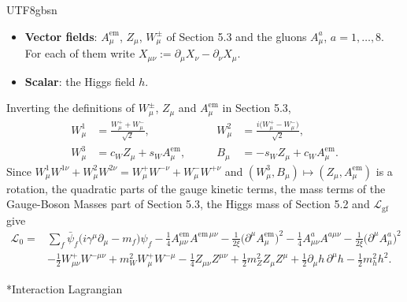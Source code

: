 \documentclass[11pt,a4paper,oneside]{report}
\makeatletter
\newcommand\topic{\@startsection{paragraph}{4}{\z@}{-1.7ex plus -.3ex}{.5ex}{\normalfont\normalsize\bfseries\itshape\boldmath}*}
\makeatother
\begin{document}
\begin{CJK*}{UTF8}{gbsn}
\begin{itemize}
\item \textbf{\boldmath Vector fields}: $A^{\mathrm{em}}_\mu$, $Z_\mu$, $W^\pm_\mu$ of Section 5.3 and the gluons $A^a_\mu$, $a=1,\ldots,8$. For each of them write $X_{\mu\nu}:=\partial_\mu X_\nu-\partial_\nu X_\mu$.

\item \textbf{\boldmath Scalar}: the Higgs field $h$.
\end{itemize}


Inverting the definitions of $W^\pm_\mu$, $Z_\mu$ and $A^{\mathrm{em}}_\mu$ in Section 5.3,
\begin{equation*}
\begin{aligned}
W^1_\mu&=\frac{W^+_\mu+W^-_\mu}{\sqrt2},&\qquad 
W^2_\mu&=\frac{i\bigl(W^+_\mu-W^-_\mu\bigr)}{\sqrt2},\\[3pt]
W^3_\mu&=c_WZ_\mu+s_WA^{\mathrm{em}}_\mu,&\qquad 
B_\mu&=-s_WZ_\mu+c_WA^{\mathrm{em}}_\mu .
\end{aligned}
\tag{A.2}\label{eq:A.2}
\end{equation*}
Since $W^1_\mu W^{1\nu}+W^2_\mu W^{2\nu}=W^+_\mu W^{-\nu}+W^-_\mu W^{+\nu}$ and $(W^3_\mu,B_\mu)\mapsto(Z_\mu,A^{\mathrm{em}}_\mu)$ is a rotation, the quadratic parts of the gauge kinetic terms, the mass terms of the Gauge-Boson Masses part of Section 5.3, the Higgs mass of Section 5.2 and $\mathcal L_{\mathrm{gf}}$ give
\begin{equation*}
\begin{aligned}
\mathcal L_0={}&\sum_f\bar\psi_f\bigl(i\gamma^\mu\partial_\mu-m_f\bigr)\psi_f
-\frac14A^{\mathrm{em}}_{\mu\nu}A^{\mathrm{em}\,\mu\nu}-\frac1{2\xi}\bigl(\partial^\mu A^{\mathrm{em}}_\mu\bigr)^2
-\frac14A^a_{\mu\nu}A^{a\mu\nu}-\frac1{2\xi}\bigl(\partial^\mu A^a_\mu\bigr)^2\\
&-\frac12W^+_{\mu\nu}W^{-\mu\nu}+m_W^2W^+_\mu W^{-\mu}
-\frac14Z_{\mu\nu}Z^{\mu\nu}+\frac12m_Z^2Z_\mu Z^\mu
+\frac12\partial_\mu h\,\partial^\mu h-\frac12m_h^2h^2 .
\end{aligned}
\tag{A.3}\label{eq:A.3}
\end{equation*}

\topic{Interaction Lagrangian}


\end{CJK*}
\end{document}
